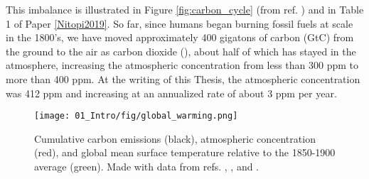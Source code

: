 This imbalance is illustrated in Figure \ref{fig:carbon_cycle} (from ref. ) and in Table 1 of Paper \ref{Nitopi2019}. So far, since humans began burning fossil fuels at scale in the 1800's, we have moved approximately 400 gigatons of carbon (GtC) from the ground to the air as carbon dioxide (), about half of which has stayed in the atmosphere, increasing the atmospheric  concentration from less than 300 ppm to more than 400 ppm\cite{IPCC2014, LeQuere2018}. At the writing of this Thesis, the atmospheric  concentration was 412 ppm and increasing at an annualized rate of about 3 ppm per year\cite{NOAA2019}. 

\begin{figure}[h!]
	\centering
	\texttt{[image: 01\_Intro/fig/global\_warming.png]}
	\caption{Cumulative carbon emissions (black), atmospheric  concentration (red), and global mean surface temperature relative to the 1850-1900 average (green). Made with data from refs. , , and .}
	\label{fig:temperatures}
\end{figure}

